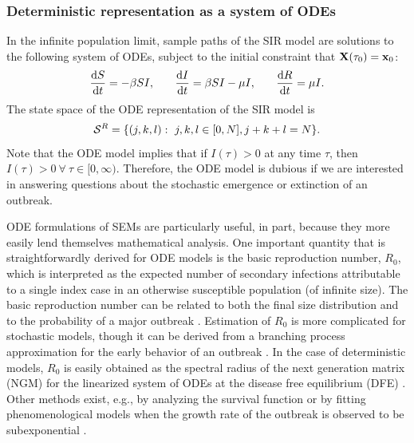 \subsubsection{Deterministic representation as a system of ODEs}
\label{subsec:deterministic_models}

In the infinite population limit, sample paths of the SIR model are solutions to the following system of ODEs, subject to the initial constraint that $ \mathbf{X}(\tau_0) = \mathbf{x}_0 $:
\begin{align*}
\frac{\mathrm{d} S}{\mathrm{d} t} = -\beta S I,\hspace{0.25in} 
\frac{\mathrm{d} I}{\mathrm{d} t} = \beta S I - \mu I,\hspace{0.25in} 
\frac{\mathrm{d} R}{\mathrm{d} t} = \mu I.
\end{align*}
The state space of the ODE representation of the SIR model is $$ \mcS^R =  \lbrace(j,k,l):\ j,k,l\in[0,N], j+k+l = N\rbrace. $$ Note that the ODE model implies that if $ I(\tau) > 0 $ at any time $ \tau $, then $ I(\tau) > 0\ \forall\ \tau\in[0,\infty)$. Therefore, the ODE model is dubious if we are interested in answering questions about the stochastic emergence or extinction of an outbreak.

ODE formulations of SEMs are particularly useful, in part, because they more easily lend themselves mathematical analysis. One important quantity that is straightforwardly derived for ODE models is the basic reproduction number, $ R_0 $, which is interpreted as the expected number of secondary infections attributable to a single index case in an otherwise susceptible population (of infinite size). The basic reproduction number can be related to both the final size distribution and to the probability of a major outbreak \cite{allen2017primer,miller2012note}. Estimation of $ R_0 $ is more complicated for stochastic models, though it can be derived from a branching process approximation for the early behavior of an outbreak \cite{allen2008introduction}. In the case of deterministic models, $ R_0 $ is easily obtained as the spectral radius of the next generation matrix (NGM) for the linearized system of ODEs at the disease free equilibrium (DFE) \cite{diekmann2009construction,van2017reproduction}. Other methods exist, e.g., by analyzing the survival function or by fitting phenomenological models when the growth rate of the outbreak is observed to be subexponential \cite{van2017reproduction}.

